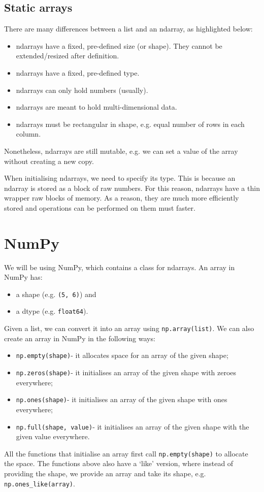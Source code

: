 \documentclass[a4paper, openany]{memoir}
\begin{document}
    \subsection{Static arrays}
    There are many differences between a list and an ndarray, as highlighted below:
    \begin{itemize}
        \item ndarrays have a fixed, pre-defined size (or shape). They cannot be extended/resized after definition.
        \item ndarrays have a fixed, pre-defined type.
        \item ndarrays can only hold numbers (usually).
        \item ndarrays are meant to hold multi-dimensional data.
        \item ndarrays must be rectangular in shape, e.g. equal number of rows in each column.
    \end{itemize}
    Nonetheless, ndarrays are still mutable, e.g. we can set a value of the array without creating a new copy.

    When initialising ndarrays, we need to specify its type. This is because an ndarray is stored as a block of raw numbers. For this reason, ndarrays have a thin wrapper raw blocks of memory. As a reason, they are much more efficiently stored and operations can be performed on them must faster.

    \section{NumPy}
    We will be using NumPy, which contains a class for ndarrays. An array in NumPy has:
    \begin{itemize}
        \item a shape (e.g. \texttt{(5, 6)}) and
        \item a dtype (e.g. \texttt{float64}).
    \end{itemize}

    Given a list, we can convert it into an array using \texttt{np.array(list)}. We can also create an array in NumPy in the following ways:
    \begin{itemize}
        \item \texttt{np.empty(shape)}- it allocates space for an array of the given shape;
        \item \texttt{np.zeros(shape)}- it initialises an array of the given shape with zeroes everywhere;
        \item \texttt{np.ones(shape)}- it initialises an array of the given shape with ones everywhere;
        \item \texttt{np.full(shape, value)}- it initialises an array of the given shape with the given value everywhere.
    \end{itemize}
    All the functions that initialise an array first call \texttt{np.empty(shape)} to allocate the space. The functions above also have a `like' version, where instead of providing the shape, we provide an array and take its shape, e.g. \texttt{np.ones\_like(array)}.
\end{document}
